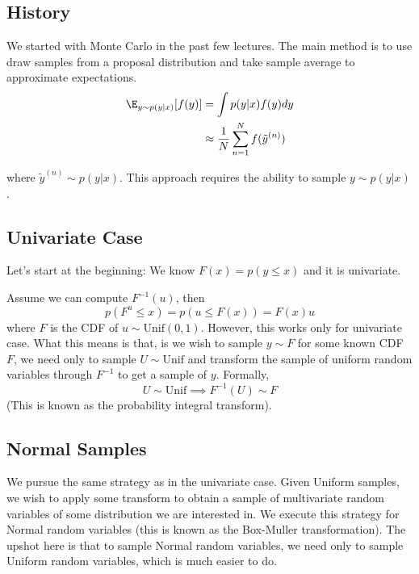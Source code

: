 \documentclass{article}
\begin{document}

\subsection{History} 
We started with Monte Carlo in the past few lectures. The main method is to use draw samples from a proposal distribution and take sample average to approximate expectations.
\begin{align*}
    \E_{y \sim p(y|x)}[f(y)] & = \int p(y|x) f(y) dy \\
    & \approx \frac{1}{N} \sum_{n=1}^{N} f(\tilde{y}^{(n)})
\end{align*}

where $\tilde{y}^{(n)} \sim p(y|x)$. This approach requires the ability to sample $y \sim p(y|x)$.

\subsection{Univariate Case}
Let's start at the beginning:  We know $F(x) = p(y \leq x)$ and it is univariate. 





Assume we can compute $F^{-1}(u)$, then 
$$ p(F^{u}\leq x) = p(u\leq F(x)) = F(x) u$$
where $F$ is the CDF of $u \sim \text{Unif}(0,1)$. However, this works only for univariate case. What this means is that, is we wish to sample $y \sim F$ for some known CDF $F$, we need only to sample $U\sim \text{Unif}$ and transform the sample of uniform random variables through $F^{-1}$ to get a sample of $y$. Formally, 
\[
U \sim \text{Unif} \implies F^{-1}(U) \sim F 
\]
(This is known as the probability integral transform).

\subsection{Normal Samples}
We pursue the same strategy as in the univariate case. Given Uniform samples, we wish to apply some transform to obtain a sample of multivariate random variables of some distribution we are interested in. We execute this strategy for Normal random variables (this is known as the Box-Muller transformation). The upshot here is that to sample Normal random variables, we need only to sample Uniform random variables, which is much easier to do.
\end{document}
